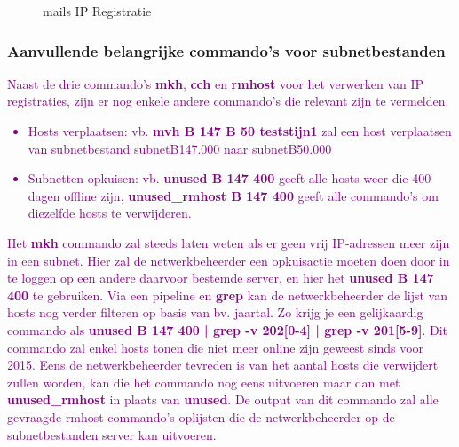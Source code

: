 \begin{figure}[H]
    \hspace*{\fill}
    \hspace*{\fill}
    \caption{mails IP Registratie}
    \label{fig:netadminMail}
\end{figure}

\subsubsection{Aanvullende belangrijke commando's voor subnetbestanden}
\textcolor{purple}{Naast de drie commando's \textbf{mkh}, \textbf{cch} en \textbf{rmhost} voor het verwerken van IP registraties, zijn er nog enkele andere commando's die relevant zijn te vermelden. }
\textcolor{purple}{
\begin{itemize}
    \item Hosts verplaatsen: vb. \textbf{mvh B 147 B 50 teststijn1} zal een host verplaatsen van subnetbestand subnetB147.000 naar subnetB50.000 
    \item Subnetten opkuisen: vb. \textbf{unused B 147 400} geeft alle hosts weer die 400 dagen offline zijn, \textbf{unused\_rmhost B 147 400} geeft alle commando's om diezelfde hosts te verwijderen.
\end{itemize}
}

\textcolor{purple}{Het \textbf{mkh} commando zal steeds laten weten als er geen vrij IP-adressen meer zijn in een subnet. Hier zal de netwerkbeheerder een opkuisactie moeten doen door in te loggen op een andere daarvoor bestemde server, en hier het \textbf{unused B 147 400} te gebruiken. Via een pipeline en \textbf{grep} kan de netwerkbeheerder de lijst van hosts nog verder filteren op basis van bv. jaartal. Zo krijg je een gelijkaardig commando als \textbf{unused B 147 400 | grep -v 202[0-4] | grep -v 201[5-9]}. 
Dit commando zal enkel hosts tonen die niet meer online zijn geweest sinds voor 2015. Eens de netwerkbeheerder tevreden is van het aantal hosts die verwijdert zullen worden, kan die het commando nog eens uitvoeren maar dan met \textbf{unused\_rmhost} in plaats van \textbf{unused}. De output van dit commando zal alle gevraagde rmhost commando's oplijsten die de netwerkbeheerder op de subnetbestanden server kan uitvoeren.}

